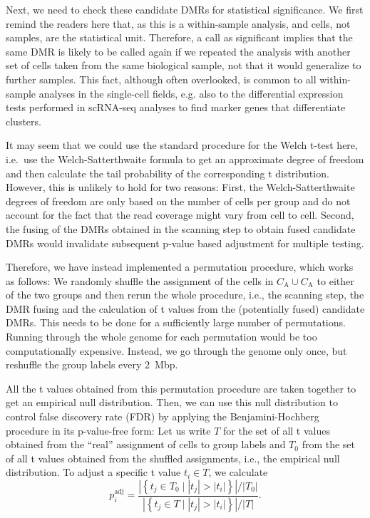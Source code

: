 \documentclass[twocolumn,10pt]{article}
\begin{document}
Next, we need to check these candidate DMRs for statistical significance.
We first remind the readers here that, as this is a within-sample analysis, and cells, not samples, are the statistical unit.
Therefore, a call as significant implies that the same DMR is likely to be called again if we repeated the analysis with another set of cells taken from the same biological sample, not that it would generalize to further samples.
This fact, although often overlooked, is common to all within-sample analyses in the single-cell fields, e.g. also to the differential expression tests performed in scRNA-seq analyses to find marker genes that differentiate clusters.

It may seem that we could use the standard procedure for the Welch t-test here, i.e.\ use the Welch-Satterthwaite formula to get an approximate degree of freedom and then calculate the tail probability of the corresponding t distribution.
However, this is unlikely to hold for two reasons:
First, the Welch-Satterthwaite degrees of freedom are only based on the number of cells per group and do not account for the fact that the read coverage might vary from cell to cell.
Second, the fusing of the DMRs obtained in the scanning step to obtain fused candidate DMRs would invalidate subsequent p-value based adjustment for multiple testing.

Therefore, we have instead implemented a permutation procedure, which works as follows:
We randomly shuffle the assignment of the cells in $C_\text{A}\cup C_\text{A}$ to either of the two groups and then rerun the whole procedure, i.e., the scanning step, the DMR fusing and the calculation of t values from the (potentially fused) candidate DMRs.
This needs to be done for a sufficiently large number of permutations.
Running through the whole genome for each permutation would be too computationally expensive.
Instead, we go through the genome only once, but reshuffle the group labels every 2~Mbp.

All the t values obtained from this permutation procedure are taken together to get an empirical null distribution.
Then, we can use this null distribution to control false discovery rate (FDR) by applying the Benjamini-Hochberg procedure in its p-value-free form:
Let us write $T$ for the set of all t values obtained from the ``real'' assignment of cells to group labels and $T_0$ from the set of all t values obtained from the shuffled assignments, i.e., the empirical null distribution.
To adjust a specific t value $t_i\in T$, we calculate
\[ p^\text{adj}_i = \frac{ \left|\left\{t_j\in T_0\mid|t_j| > |t_i| \right\}\right| \big/ |T_0|}
{ \left|\left\{t_j\in T\mid|t_j| > |t_i| \right\}\right| \big/ |T|}.\]
\end{document}
